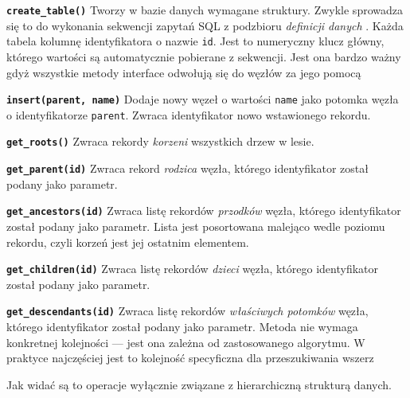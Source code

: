 \begin{itemize*}
    \item \textbf{\texttt{create\_table()}}
        Tworzy w bazie danych wymagane struktury.
        Zwykle sprowadza się to do wykonania sekwencji zapytań SQL z podzbioru \emph{definicji danych} .
        Każda tabela kolumnę identyfikatora o nazwie \texttt{id}. 
        Jest to numeryczny klucz główny,
        którego wartości są automatycznie pobierane z sekwencji.
        Jest ona bardzo ważny gdyż wszystkie metody interface odwołują się do węzłów za jego pomocą
    \item \textbf{\texttt{insert(parent, name)}}
    	Dodaje nowy węzeł o wartości \texttt{name} jako potomka węzła o identyfikatorze \texttt{parent}.
    	Zwraca identyfikator nowo wstawionego rekordu.
    \item \textbf{\texttt{get\_roots()}}
    	Zwraca rekordy  \emph{korzeni} wszystkich drzew w lesie.
    \item \textbf{\texttt{get\_parent(id)}}
    	Zwraca rekord \emph{rodzica} węzła, którego identyfikator został podany jako parametr.
    \item \textbf{\texttt{get\_ancestors(id)}}
    	Zwraca listę rekordów  \emph{przodków} węzła, którego identyfikator został podany jako parametr.
    	Lista jest posortowana malejąco wedle poziomu rekordu, czyli korzeń jest jej ostatnim elementem.
    \item \textbf{\texttt{get\_children(id)}}
    	Zwraca listę rekordów \emph{dzieci} węzła, którego identyfikator został podany jako parametr.
    \item \textbf{\texttt{get\_descendants(id)}}
    	Zwraca listę rekordów \emph{właściwych potomków} węzła, którego identyfikator został podany jako parametr.
    	Metoda nie wymaga konkretnej kolejności --- jest ona zależna od zastosowanego algorytmu.
    	W praktyce najczęściej jest to kolejność specyficzna dla przeszukiwania wszerz
\end{itemize*}

Jak widać są to operacje wyłącznie związane z hierarchiczną strukturą danych.





